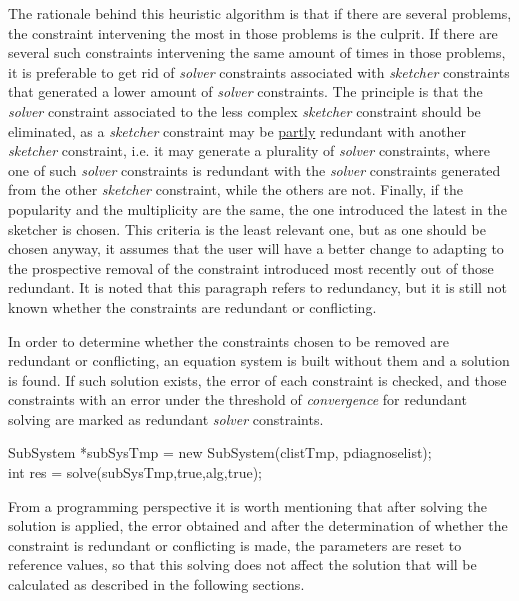 \documentclass[12pt,twoside,a4paper]{book}
\begin{document}
    The rationale behind this heuristic algorithm is that if there are several problems, the constraint intervening the most in those problems is the culprit. If there are several such constraints intervening the same amount of times in those problems, it is preferable to get rid of \emph{solver} constraints associated with \emph{sketcher} constraints that generated a lower amount of \emph{solver} constraints. The principle is that the \emph{solver} constraint associated to the less complex \emph{sketcher} constraint should be eliminated, as a \emph{sketcher} constraint may be \underline{partly} redundant with another \emph{sketcher} constraint, i.e. it may generate a plurality of \emph{solver} constraints, where one of such \emph{solver} constraints is redundant with the \emph{solver} constraints generated from the other \emph{sketcher} constraint, while the others are not. Finally, if the popularity and the multiplicity are the same, the one introduced the latest in the sketcher is chosen. This criteria is the least relevant one, but as one should be chosen anyway, it assumes that the user will have a better change to adapting to the prospective removal of the constraint introduced most recently out of those redundant. It is noted that this paragraph refers to redundancy, but it is still not known whether the constraints are redundant or conflicting.

    In order to determine whether the constraints chosen to be removed are redundant or conflicting, an equation system is built without them and a solution is found. If such solution exists, the error of each constraint is checked, and those constraints with an error under the threshold of \emph{convergence} for redundant solving are marked as redundant \emph{solver} constraints.

    \begin{codequote}
    SubSystem *subSysTmp = new SubSystem(clistTmp, pdiagnoselist);\\
    int res = solve(subSysTmp,true,alg,true);
    \end{codequote}

    From a programming perspective it is worth mentioning that after solving the solution is applied, the error obtained and after the determination of whether the constraint is redundant or conflicting is made, the parameters are reset to reference values, so that this solving does not affect the solution that will be calculated as described in the following sections.
\end{document}

